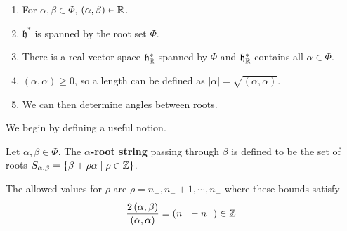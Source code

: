 \begin{enumerate}[label=\roman*)]
    \item For $\alpha , \beta \in \Phi$, $\left( \alpha, \beta \right) \in \mathbb{R}$.
    \item $\mathfrak{h}^{*}$ is spanned by the root set $\Phi$.
    \item There is a real vector space $\mathfrak{h}^{*}_{\mathbb{R}}$ spanned by $\Phi$ and $\mathfrak{h}_{\mathbb{R}}^{*}$ contains all $\alpha \in \Phi$.
    \item $\left( \alpha , \alpha \right) \geq 0$, so a length can be defined as $\left| \alpha \right| = \sqrt{\left( \alpha, \alpha \right) } $.
    \item We can then determine angles between roots.
\end{enumerate}

We begin by defining a useful notion.

\begin{definition}
    Let $\alpha , \beta \in \Phi$. The \textbf{$\alpha$-root string} passing through $\beta$ is defined to be the set of roots $S_{\alpha, \beta} = \{\beta + \rho \alpha  \mid \rho \in \mathbb{Z}\} $.
\end{definition}

\begin{claim}
    The allowed values for $\rho$ are $\rho = n_-,n_-+1, \cdots, n_+$ where these bounds satisfy
    \begin{align}
        \frac{2\left( \alpha,\beta \right) }{  \left( \alpha, \alpha \right)  } = \left( n_+ - n_- \right) \in \mathbb{Z}
    .\end{align}
\end{claim}

